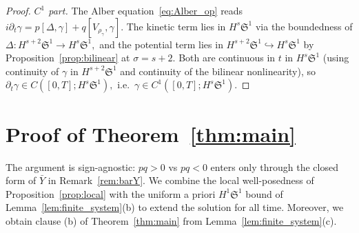 \documentclass[11pt]{amsart}
\newtheorem{corollary}[theorem]{Corollary}
\theoremstyle{definition}
\newtheorem{remark}[theorem]{Remark}
\newcommand{\T}{\mathbb{T}}
\newcommand{\Sp}{\mathfrak{S}}
\DeclareMathOperator{\tr}{tr}
\begin{document}
\begin{proof}
\smallskip
\noindent\emph{$C^1$ part.} The Alber equation~\eqref{eq:Alber_op} reads $i\partial_t\gamma=p[\Delta,\gamma]+q[V_{\rho_\gamma},\gamma].$ The kinetic term lies in $H^s\Sp^1$ via the boundedness of $\Delta:H^{s+2}\Sp^1\to H^s\Sp^1,$ and the potential term lies in $H^{s+2}\Sp^1\hookrightarrow H^s\Sp^1$ by Proposition~\ref{prop:bilinear} at $\sigma=s+2.$ Both are continuous in $t$ in $H^s\Sp^1$ (using continuity of $\gamma$ in $H^{s+2}\Sp^1$ and continuity of the bilinear nonlinearity), so $\partial_t\gamma\in C([0,T];H^s\Sp^1),$ i.e.\ $\gamma\in C^1([0,T];H^s\Sp^1).$
\end{proof}




\section{Proof of Theorem~\ref{thm:main}}\label{sec:proof_thms}

The argument is sign-agnostic: $pq>0$ vs $pq<0$ enters only through the closed form of $\bar Y$ in Remark~\ref{rem:barY}. We combine the local well-posedness of Proposition~\ref{prop:local} with the uniform a priori $H^1\Sp^1$ bound of Lemma~\ref{lem:finite_system}(b) to extend the solution for all time. Moreover, we obtain clause (b) of Theorem~\ref{thm:main} from Lemma~\ref{lem:finite_system}(c).
\end{document}
